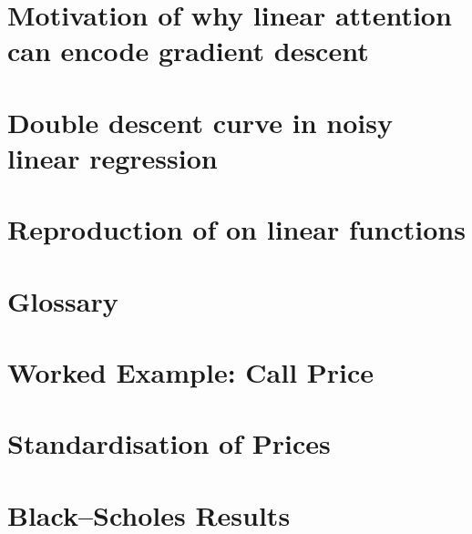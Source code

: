 \newpage
\appendix

\section{Motivation of why linear attention can encode gradient descent}
\label{app:motivation}


\section{Double descent curve in noisy linear regression}
\label{app:double_descent}


\section{Reproduction of \cite{garg2022what} on linear functions}
\label{app:reproduction}


\section{Glossary}
\label{app:glossary}


\section{Worked Example: Call Price}
\label{app:call_price}




\section{Standardisation of Prices}
\label{app:stand_price}


\section{Black--Scholes Results}
\label{app:bs-results}
\begin{table}[H]
\caption{Error against number of in-context examples $k$ for flat and smile volatility,
comparing the transformer with the prior mean and with flat and smile calibration. Bold:
the transformer has lower error than correctly specified calibration.}
\label{tab:bs-results}
\centering
\small

\end{table}